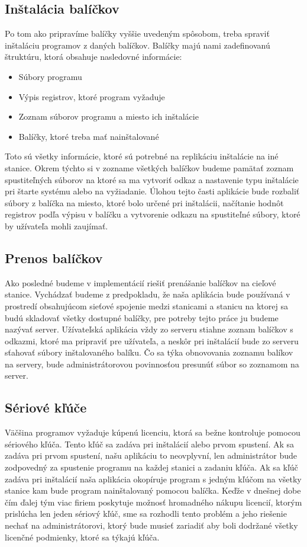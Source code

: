 \subsection{Inštalácia balíčkov}

Po tom ako pripravíme balíčky vyššie uvedeným spôsobom, treba spraviť inštaláciu programov z daných balíčkov. Balíčky majú nami zadefinovanú štruktúru, ktorá obsahuje nasledovné informácie:

\begin{itemize}
\item Súbory programu
\item Výpis registrov, ktoré program vyžaduje
\item Zoznam súborov programu a miesto ich inštalácie
\item Balíčky, ktoré treba mať nainštalované
\end{itemize}

Toto sú všetky informácie, ktoré sú potrebné na replikáciu inštalácie na iné stanice. Okrem týchto si v zozname všetkých balíčkov budeme pamätať zoznam spustiteľných súborov na ktoré sa ma vytvoriť odkaz a nastavenie typu inštalácie pri štarte systému alebo na vyžiadanie. Úlohou tejto časti aplikácie bude rozbaliť súbory z balíčka na miesto, ktoré bolo určené pri inštalácii, načítanie hodnôt registrov podľa výpisu v balíčku a vytvorenie odkazu na spustiteľné súbory, ktoré by užívateľa mohli zaujímať.

\subsection{Prenos balíčkov}

Ako posledné budeme v implementácií riešiť prenášanie balíčkov na cieľové stanice. Vychádzať budeme z predpokladu, že naša aplikácia bude používaná v prostredí obsahujúcom sieťové spojenie medzi stanicami a stanicu na ktorej sa budú skladovať všetky dostupné balíčky, pre potreby tejto práce ju budeme nazývať server. Užívateľská aplikácia vždy zo serveru stiahne zoznam balíčkov s odkazmi, ktoré ma pripraviť pre užívateľa, a neskôr pri inštalácií bude zo serveru sťahovať súbory inštalovaného balíku. Čo sa týka obnovovania zoznamu balíkov na servery, bude administrátorovou povinnosťou presunúť súbor so zoznamom na server.

\subsection{Sériové kľúče}
Väčšina programov vyžaduje kúpenú licenciu, ktorá sa bežne kontroluje pomocou sériového kľúča. Tento kľúč sa zadáva pri inštalácií alebo prvom spustení. Ak sa zadáva pri prvom spustení, našu aplikáciu to neovplyvní, len administrátor bude zodpovedný za spustenie programu na každej stanici a zadaniu kľúča. Ak sa kľúč zadáva pri inštalácií naša aplikácia okopíruje program s jedným kľúčom na všetky stanice kam bude program nainštalovaný pomocou balíčka. Keďže v dnešnej dobe čím ďalej tým viac firiem poskytuje možnosť hromadného nákupu licencií, ktorým prislúcha len jeden sériový kľúč, sme sa rozhodli tento problém a jeho riešenie nechať na administrátorovi, ktorý bude musieť zariadiť aby boli dodržané všetky licenčné podmienky, ktoré sa týkajú kľúča.

